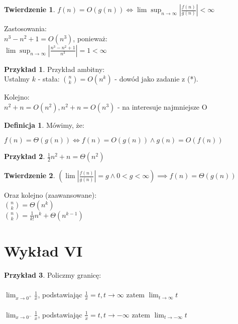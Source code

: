 \documentclass{article}
\theoremstyle{definition}
\newtheorem{de}{Definicja}[subsection]
\theoremstyle{definition}
\newtheorem{tw}{Twierdzenie}[subsection]
\theoremstyle{definition}
\newtheorem{pk}{Przykład}[subsection]
\theoremstyle{definition}
\begin{document}
\begin{tw}
    $f(n) = O(g(n)) \iff \lim \sup_{n\rightarrow \infty} \left|\frac{f(n)}{g(n)}\right|<\infty$
\end{tw}
Zastosowania:\\
$n^3-n^2+1=O(n^3)$, ponieważ:\\
$\lim \sup_{n\rightarrow \infty} \left|\frac{n^3-n^2+1}{n^3}\right|=1<\infty$

\begin{pk}
    Przykład ambitny:\\
    Ustalmy $k$ - stała:
    $\binom{n}{k}=O(n^k)$ - dowód jako zadanie z (*).
\end{pk}

Kolejno:\\
$n^2+n=O(n^2), n^2+n=O(n^3)$ - na interesuje najmniejsze O

\begin{de}
    Mówimy, że:
    \begin{center}
        $f(n) = \Theta(g(n))\iff f(n)=O(g(n)) \land g(n)=O(f(n))$
    \end{center}
\end{de}

\begin{pk}
    $\frac{1}{2} n^2 + n = \Theta(n^2)$
\end{pk}

\begin{tw}
$\left(\lim \left|\frac{f(n)}{g(n)}\right|=g \land 0<g<\infty \right)\implies f(n)=\Theta(g(n))$
\end{tw}

Oraz kolejno (zaawansowane):\\
$\binom{n}{k}=\Theta (n^k)$\\
$\binom{n}{k}=\frac{1}{k!} n^k + \Theta(n^{k-1})$

\section{Wykład VI}

\begin{pk}
    Policzmy granicę:\\\\
    $\lim_{x\rightarrow 0^+} \frac{1}{x}$, podstawiając $\frac{1}{x}=t, t\rightarrow\infty$ zatem $\lim_{t\rightarrow \infty} t $\\\\
    $\lim_{x\rightarrow 0^-} \frac{1}{x}$, podstawiając $\frac{1}{x}=t, t\rightarrow -\infty$ zatem $\lim_{t\rightarrow -\infty} t $
\end{pk}
\end{document}
